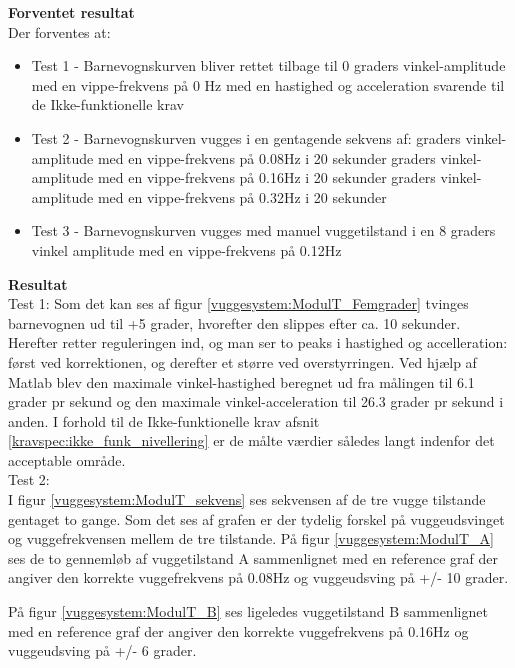 \textbf{Forventet resultat} \\
Der forventes at:
\begin{itemize}
	\item Test 1 - Barnevognskurven bliver rettet tilbage til 0 graders vinkel-amplitude med en vippe-frekvens på 0 Hz med en hastighed og acceleration svarende til de Ikke-funktionelle krav
	\item Test 2 - Barnevognskurven vugges i en gentagende sekvens af:
		 graders vinkel-amplitude med en vippe-frekvens på 0.08Hz i 20 sekunder 
		 graders vinkel-amplitude med en vippe-frekvens på 0.16Hz  i 20 sekunder  
		 graders vinkel-amplitude med en vippe-frekvens på 0.32Hz i 20 sekunder 
	\item Test 3 - Barnevognskurven vugges med manuel vuggetilstand i en 8 graders vinkel amplitude med en vippe-frekvens på 0.12Hz
\end{itemize}


\textbf{Resultat} \\
Test 1:
Som det kan ses af figur \ref{vuggesystem:ModulT_Femgrader} tvinges barnevognen ud til +5 grader, hvorefter den slippes efter ca. 10 sekunder. Herefter retter reguleringen ind, og man ser to peaks i hastighed og accelleration: først ved korrektionen, og derefter et større ved overstyrringen.
Ved hjælp af Matlab blev den maximale vinkel-hastighed beregnet ud fra målingen til 6.1 grader pr sekund og den maximale vinkel-acceleration til 26.3 grader pr sekund i anden. I forhold til de Ikke-funktionelle krav afsnit \vref{kravspec:ikke_funk_nivellering} er de målte værdier således langt indenfor det acceptable område. \\

Test 2: \\
I figur \ref{vuggesystem:ModulT_sekvens} ses sekvensen af de tre vugge tilstande gentaget to gange. Som det ses af grafen er der tydelig forskel på vuggeudsvinget og vuggefrekvensen mellem de tre tilstande.
På figur \ref{vuggesystem:ModulT_A} ses de to gennemløb af vuggetilstand A sammenlignet med en reference graf der angiver den korrekte vuggefrekvens på 0.08Hz og vuggeudsving på +/- 10 grader. 
 
På figur \ref{vuggesystem:ModulT_B} ses ligeledes vuggetilstand B sammenlignet med en reference graf der angiver den korrekte vuggefrekvens på 0.16Hz og vuggeudsving på +/- 6 grader.

